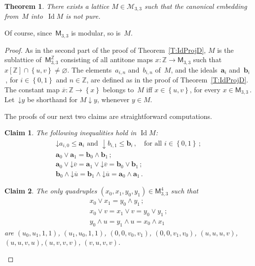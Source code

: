 \documentclass[reqno]{amsart}
\numberwithin{equation}{section}
\theoremstyle{plain}
\newtheorem{theorem}{Theorem}[section]
\newtheorem{claim}{Claim}
\theoremstyle{definition}
\theoremstyle{remark}
\numberwithin{figure}{section}
\numberwithin{table}{section}
\begin{document}
\begin{theorem}\label{T:Notpure}
There exists a lattice $M\in{\mathcal{M}}_{3,3}$ such that the canonical embedding from~$M$ into~$\operatorname{Id} M$ is not pure.
\end{theorem}

Of course, since~${{\mathsf{M}}}_{3,3}$ is modular, so is~$M$.

\begin{proof}
As in the second part of the proof of Theorem~\ref{T:IdProjD}, $M$ is the sublattice of~${{\mathsf{M}}}_{3,3}^{\mathbb{Z}}$ consisting of all antitone maps $x\colon{\mathbb{Z}}\to{{\mathsf{M}}}_{3,3}$ such that $x[{\mathbb{Z}}]\cap{\left\{{u,v}\right\}}\neq{\varnothing}$.
The elements~$a_{i,n}$ and~$b_{i,n}$ of~$M$, and the ideals~${\boldsymbol{a}}_i$ and~${\boldsymbol{b}}_i$\,, for $i\in{\left\{{0,1}\right\}}$ and $n\in{\mathbb{Z}}$, are defined as in the proof of Theorem~\ref{T:IdProjD}.
The constant map ${\overline{{x}}}\colon{\mathbb{Z}}\to{\left\{{x}\right\}}$ belongs to~$M$ if{f} $x\in{\left\{{u,v}\right\}}$, for every $x\in{{\mathsf{M}}}_{3,3}$\,.
Let~${\mathbin{\downarrow}} y$ be shorthand for $M{\mathbin{\downarrow}} y$, whenever $y\in M$.

\setcounter{claim}{0}

The proofs of our next two claims are straightforward computations.

\begin{claim}\label{Cl:IdealSys}
The following inequalities hold in $\operatorname{Id} M$:
 \begin{gather*}
 {\mathbin{\downarrow}} a_{i,0}\leq{\boldsymbol{a}}_i\text{ and }{\mathbin{\downarrow}} b_{i,1}\leq{\boldsymbol{b}}_i\,,
 \quad\text{for all }i\in{\left\{{0,1}\right\}}\,;\\
 {\boldsymbol{a}}_0\vee{\boldsymbol{a}}_1={\boldsymbol{b}}_0\wedge{\boldsymbol{b}}_1\,;\\
 {\boldsymbol{a}}_0\vee{\mathbin{\downarrow}}{\overline{{v}}}={\boldsymbol{a}}_1\vee{\mathbin{\downarrow}}{\overline{{v}}}={\boldsymbol{b}}_0\vee{\boldsymbol{b}}_1\,;\\
 {\boldsymbol{b}}_0\wedge{\mathbin{\downarrow}}{\overline{{u}}}={\boldsymbol{b}}_1\wedge{\mathbin{\downarrow}}{\overline{{u}}}={\boldsymbol{a}}_0\wedge{\boldsymbol{a}}_1\,.
 \end{gather*}
\end{claim}

\begin{claim}\label{Cl:ResSys}
The only quadruples $(x_0,x_1,y_0,y_1)\in{{\mathsf{M}}}_{3,3}^4$ such that
 \begin{gather*}
 x_0\vee x_1=y_0\wedge y_1\,;\\
 x_0\vee v=x_1\vee v=y_0\vee y_1\,;\\
 y_0\wedge u=y_1\wedge u=x_0\wedge x_1 
 \end{gather*}
are $(u_0,u_1,1,1)$, $(u_1,u_0,1,1)$, $(0,0,v_0,v_1)$, $(0,0,v_1,v_0)$, $(u,u,u,v)$, $(u,u,v,u)$,\linebreak $(u,v,v,v)$, $(v,u,v,v)$.
\end{claim}


\end{proof}
\end{document}
